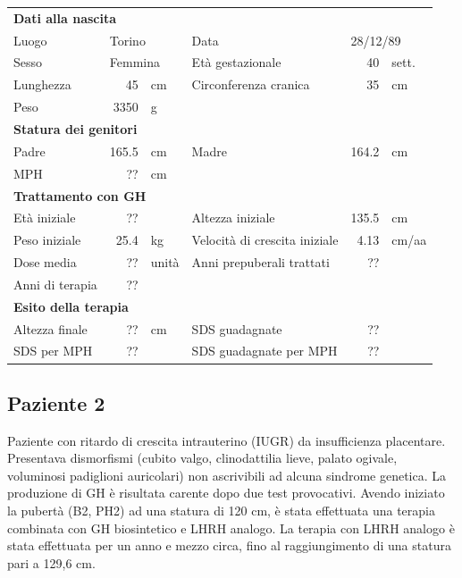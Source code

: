 \begin{table}[!h]
\begin{tabular}{lrllrl}
\toprule
\multicolumn{6}{l}{\textbf{Dati alla nascita}}\\
Luogo 		& \multicolumn{2}{l}{Torino} 	& Data 					& \multicolumn{2}{l}{28/12/89} 	\\
Sesso 		& \multicolumn{2}{l}{Femmina} 	& Età gestazionale 		& 40 		& sett.\\
Lunghezza 	& 45 		& cm 					& Circonferenza cranica	& 35 		& cm\\
Peso 		& 3350 		& g\\
\midrule
\multicolumn{6}{l}{\textbf{Statura dei genitori}}\\
Padre 		& 165.5 & cm 	& Madre 				& 164.2 & cm \\
MPH 		& ?? 	& cm \\
\midrule
\multicolumn{6}{l}{\textbf{Trattamento con GH}} \\
Età	iniziale	& ?? & 		& Altezza iniziale 				& 135.5 & cm  \\
Peso iniziale	& 25.4 & kg	& Velocità di crescita iniziale & 4.13 & cm/aa\\
Dose media		& ?? & unità & Anni prepuberali trattati		& ??\\
Anni di terapia & ??\\
\midrule
\multicolumn{6}{l}{\textbf{Esito della terapia}} \\
Altezza finale	& ?? & cm 	& SDS guadagnate 			& ??\\
SDS per MPH		& ?? &		& SDS guadagnate per MPH	& ??\\
\bottomrule
\end{tabular}
\end{table}
\clearpage

\subsection*{Paziente 2}%

Paziente con ritardo di crescita intrauterino (IUGR) da insufficienza placentare.
Presentava dismorfismi (cubito valgo, clinodattilia lieve, palato ogivale, voluminosi padiglioni auricolari) non ascrivibili ad alcuna sindrome genetica. La produzione di GH è risultata carente dopo due test provocativi. Avendo iniziato la pubertà (B2, PH2) ad una statura di 120 cm, è stata effettuata una terapia combinata con GH biosintetico e LHRH analogo. La terapia con LHRH analogo è stata effettuata per un anno e mezzo circa, fino al raggiungimento di una statura pari a 129,6 cm.

